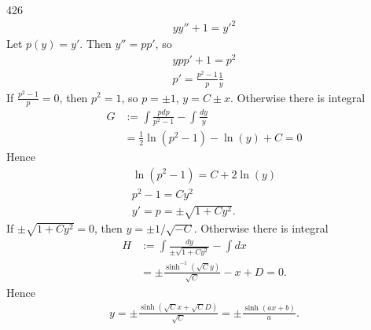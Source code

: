 \documentclass[12pt,a4paper]{article}
\begin{document}
    \begin{problem}{426}
        \begin{gather*}
            y y'' + 1 = y'^2
        \end{gather*}
        Let $p(y) = y'$. Then $y'' = pp'$, so
        \begin{gather*}
            ypp' + 1 = p^2\\
            p' = \frac{p^2 - 1}{p} \frac{1}{y}
        \end{gather*}
        If $\frac{p^2 - 1}{p} = 0$, then $p^2 = 1$, so $p = \pm 1$, $y = C \pm x$. Otherwise there is integral
        \begin{align*}
            G
            &:= \int \frac{pdp}{p^2 - 1} - \int \frac{dy}{y}\\
            &= \frac{1}{2}\ln(p^2 - 1) - \ln(y) + C = 0
        \end{align*}
        Hence
        \begin{gather*}
            \ln(p^2 - 1) = C + 2\ln(y)\\
            p^2 - 1 = C y^2\\
            y' = p = \pm \sqrt{1 + Cy^2}.
        \end{gather*}
        If $\pm \sqrt{1 + Cy^2} = 0$, then $y = \pm 1/\sqrt{-C}$. Otherwise there is integral
        \begin{align*}
            H
            &:= \int \frac{dy}{\pm \sqrt{1 + Cy^2}} - \int dx\\
            &= \pm \frac{\sinh^{-1}(\sqrt{C}y)}{\sqrt{C}} - x + D = 0.
        \end{align*}
        Hence
        \begin{gather*}
            y = \pm \frac{\sinh(\sqrt{C}x + \sqrt{C} D)}{\sqrt{C}} = \pm \frac{\sinh(ax + b)}{a}.
        \end{gather*}
    \end{problem}
\end{document}
